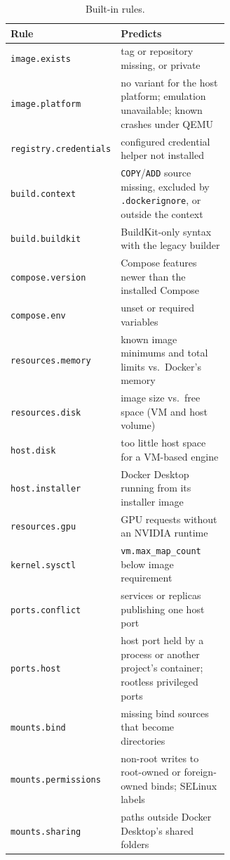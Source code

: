 \documentclass[preprint,12pt]{elsarticle}
\begin{document}
\begin{table}[t]
\centering\footnotesize
\caption{Built-in rules.}
\label{tab:rules}
\begin{tabular}{@{}lp{0.62\linewidth}@{}}
\toprule
Rule & Predicts \\
\midrule
\texttt{image.exists} & tag or repository missing, or private \\
\texttt{image.platform} & no variant for the host platform; emulation unavailable; known crashes under QEMU \\
\texttt{registry.credentials} & configured credential helper not installed \\
\texttt{build.context} & \texttt{COPY}/\texttt{ADD} source missing, excluded by \texttt{.dockerignore}, or outside the context \\
\texttt{build.buildkit} & BuildKit-only syntax with the legacy builder \\
\texttt{compose.version} & Compose features newer than the installed Compose \\
\texttt{compose.env} & unset or required variables \\
\texttt{resources.memory} & known image minimums and total limits vs.\ Docker's memory \\
\texttt{resources.disk} & image size vs.\ free space (VM and host volume) \\
\texttt{host.disk} & too little host space for a VM-based engine \\
\texttt{host.installer} & Docker Desktop running from its installer image \\
\texttt{resources.gpu} & GPU requests without an NVIDIA runtime \\
\texttt{kernel.sysctl} & \texttt{vm.max\_map\_count} below image requirement \\
\texttt{ports.conflict} & services or replicas publishing one host port \\
\texttt{ports.host} & host port held by a process or another project's container; rootless privileged ports \\
\texttt{mounts.bind} & missing bind sources that become directories \\
\texttt{mounts.permissions} & non-root writes to root-owned or foreign-owned binds; SELinux labels \\
\texttt{mounts.sharing} & paths outside Docker Desktop's shared folders \\
\bottomrule
\end{tabular}
\end{table}
\end{document}
